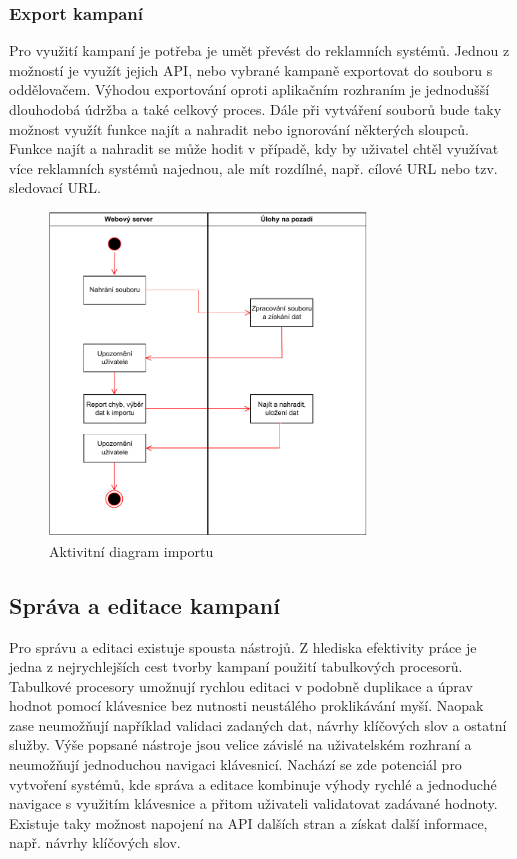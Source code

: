 \subsubsection{Export kampaní}
Pro využití kampaní je potřeba je umět převést do reklamních systémů. Jednou z možností je využít jejich API, nebo vybrané kampaně exportovat do souboru
s oddělovačem. Výhodou exportování oproti aplikačním rozhraním je jednodušší dlouhodobá údržba a také celkový proces. Dále při vytváření souborů
bude taky možnost využít funkce najít a nahradit nebo ignorování některých sloupců. Funkce najít a nahradit se může hodit v případě, kdy by uživatel chtěl využívat
více reklamních systémů najednou, ale mít rozdílné, např. cílové URL nebo tzv. sledovací URL.

\begin{figure}[h]
    \centering
    \includegraphics[width=0.75\textwidth]{Figures/import-activity-diagram.pdf}
    \caption{Aktivitní diagram importu}
    \label{fig:import-activity-diagram}
\end{figure}

\subsection{Správa a editace kampaní}
\label{subsec:edit-campaigns}
Pro správu a editaci existuje spousta nástrojů. Z hlediska efektivity práce je jedna z nejrychlejších cest tvorby kampaní použití tabulkových procesorů. Tabulkové procesory
umožnují rychlou editaci v podobně duplikace a úprav hodnot pomocí klávesnice bez nutnosti neustálého proklikávání myší. Naopak zase neumožňují například validaci
zadaných dat, návrhy klíčových slov a ostatní služby. Výše popsané nástroje jsou velice závislé na uživatelském rozhraní a neumožňují jednoduchou navigaci klávesnicí.
Nachází se zde potenciál pro vytvoření systémů, kde správa a editace kombinuje výhody rychlé a jednoduché navigace s využitím klávesnice a přitom uživateli validatovat
zadávané hodnoty. Existuje taky možnost napojení na API dalších stran a získat další informace, např. návrhy klíčových slov.

